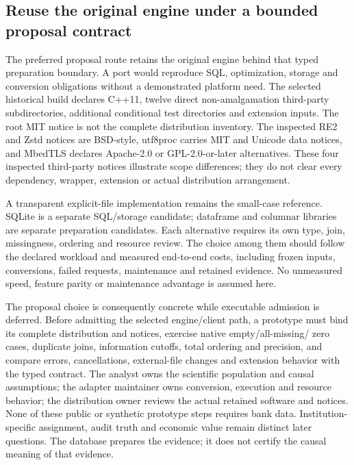 \subsection{Reuse the original engine under a bounded proposal contract}
\label{exec19:duckdb-route}

The preferred proposal route retains the original engine behind that typed
preparation boundary. A port would reproduce SQL, optimization, storage and
conversion obligations without a demonstrated platform need. The selected
historical build declares C++11, twelve direct non-amalgamation third-party
subdirectories, additional conditional test directories and extension inputs.
The root MIT notice is not the complete distribution inventory. The inspected
RE2 and Zstd notices are BSD-style, utf8proc carries MIT and Unicode data
notices, and MbedTLS declares Apache-2.0 or GPL-2.0-or-later alternatives. These
four inspected third-party notices illustrate scope differences; they do not
clear every dependency, wrapper, extension or actual distribution arrangement.
\citep{exec19_duckdb_source}

A transparent explicit-file implementation remains the small-case reference.
SQLite is a separate SQL/storage candidate; dataframe and columnar libraries
are separate preparation candidates. Each alternative requires its own type,
join, missingness, ordering and resource review. The choice among them should
follow the declared workload and measured end-to-end costs, including frozen
inputs, conversions, failed requests, maintenance and retained evidence. No
unmeasured speed, feature parity or maintenance advantage is assumed here.

The proposal choice is consequently concrete while executable admission is
deferred. Before admitting the selected engine/client path, a prototype must
bind its complete distribution and notices, exercise native empty/all-missing/
zero cases, duplicate joins, information cutoffs, total ordering and precision,
and compare errors, cancellations, external-file changes and extension
behavior with the typed contract. The analyst owns the scientific population
and causal assumptions; the adapter maintainer owns conversion, execution and
resource behavior; the distribution owner reviews the actual retained software
and notices. None of these public or synthetic prototype steps requires bank
data. Institution-specific assignment, audit truth and economic value remain
distinct later questions. The database prepares the evidence; it does not
certify the causal meaning of that evidence.
